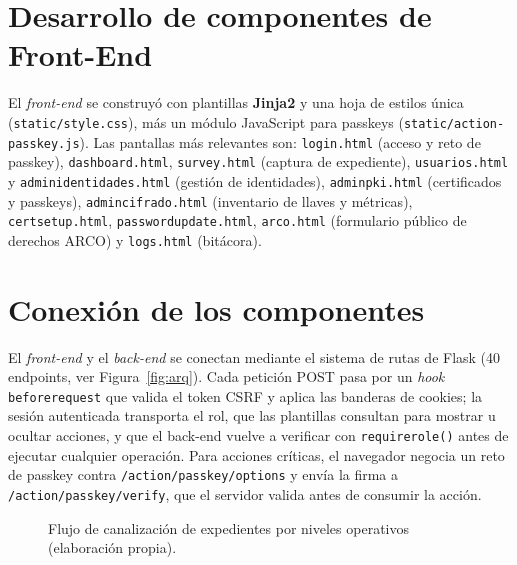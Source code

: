 \documentclass[10pt,letterpaper]{report}
\renewcommand{\_}{\textunderscore\allowbreak}
\begin{document}
\section{Desarrollo de componentes de Front-End}
El \textit{front-end} se construy\'o con plantillas \textbf{Jinja2} y una hoja de
estilos \'unica (\texttt{static/style.css}), m\'as un m\'odulo JavaScript para
passkeys (\texttt{static/action-passkey.js}). Las pantallas m\'as relevantes son:
\texttt{login.html} (acceso y reto de passkey), \texttt{dashboard.html},
\texttt{survey.html} (captura de expediente), \texttt{usuarios.html} y
\texttt{admin\_identidades.html} (gesti\'on de identidades),
\texttt{admin\_pki.html} (certificados y passkeys), \texttt{admin\_cifrado.html}
(inventario de llaves y m\'etricas), \texttt{cert\_setup.html},
\texttt{password\_update.html}, \texttt{arco.html} (formulario p\'ublico de
derechos ARCO) y \texttt{logs.html} (bit\'acora).

\section{Conexi\'on de los componentes}
El \textit{front-end} y el \textit{back-end} se conectan mediante el sistema de
rutas de Flask (40 endpoints, ver Figura~\ref{fig:arq}). Cada petici\'on POST pasa
por un \textit{hook} \texttt{before\_request} que valida el token CSRF y aplica
las banderas de cookies; la sesi\'on autenticada transporta el rol, que las
plantillas consultan para mostrar u ocultar acciones, y que el back-end vuelve a
verificar con \texttt{require\_role()} antes de ejecutar cualquier operaci\'on.
Para acciones cr\'iticas, el navegador negocia un reto de passkey contra
\texttt{\slash action\slash passkey\slash options} y env\'ia la firma a
\texttt{\slash action\slash passkey\slash verify}, que el servidor valida antes de consumir la
acci\'on.

\begin{figure}[ht]
\centering
{}
\caption{Flujo de canalizaci\'on de expedientes por niveles operativos
(elaboraci\'on propia).}
\label{fig:flujo}
\end{figure}
\end{document}
